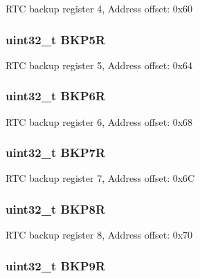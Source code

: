 R\-T\-C backup register 4, Address offset\-: 0x60 \hypertarget{struct_r_t_c___type_def_ab6bed862c0d0476ff4f89f7b9bf3e130}{
\subsubsection[{B\-K\-P5\-R}]{ uint32\-\_\-t B\-K\-P5\-R}}\label{struct_r_t_c___type_def_ab6bed862c0d0476ff4f89f7b9bf3e130}
R\-T\-C backup register 5, Address offset\-: 0x64 \hypertarget{struct_r_t_c___type_def_a1d854d2d7f0452f4c90035952b92d2ba}{
\subsubsection[{B\-K\-P6\-R}]{ uint32\-\_\-t B\-K\-P6\-R}}\label{struct_r_t_c___type_def_a1d854d2d7f0452f4c90035952b92d2ba}
R\-T\-C backup register 6, Address offset\-: 0x68 \hypertarget{struct_r_t_c___type_def_a2ca54ce1a8d2fa9d1ba6d5987ed5e2cf}{
\subsubsection[{B\-K\-P7\-R}]{ uint32\-\_\-t B\-K\-P7\-R}}\label{struct_r_t_c___type_def_a2ca54ce1a8d2fa9d1ba6d5987ed5e2cf}
R\-T\-C backup register 7, Address offset\-: 0x6\-C \hypertarget{struct_r_t_c___type_def_ac1085f6aae54b353c30871fe90c59851}{
\subsubsection[{B\-K\-P8\-R}]{ uint32\-\_\-t B\-K\-P8\-R}}\label{struct_r_t_c___type_def_ac1085f6aae54b353c30871fe90c59851}
R\-T\-C backup register 8, Address offset\-: 0x70 \hypertarget{struct_r_t_c___type_def_a6c33564df6eaf97400e0457dde9b14ef}{
\subsubsection[{B\-K\-P9\-R}]{ uint32\-\_\-t B\-K\-P9\-R}}\label{struct_r_t_c___type_def_a6c33564df6eaf97400e0457dde9b14ef}
